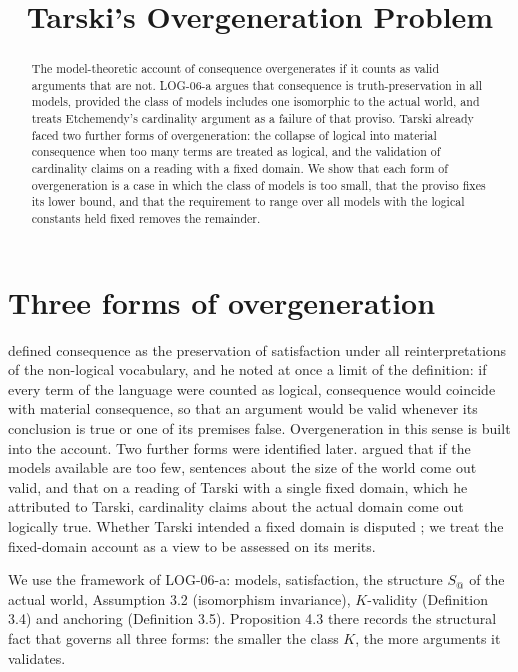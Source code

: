 \documentclass{situationist-preprint}
\title{Tarski's Overgeneration Problem}
\begin{document}
\maketitle

\begin{abstract}
The model-theoretic account of consequence overgenerates if it counts as valid arguments that are not. LOG-06-a argues that consequence is truth-preservation in all models, provided the class of models includes one isomorphic to the actual world, and treats Etchemendy's cardinality argument as a failure of that proviso. Tarski already faced two further forms of overgeneration: the collapse of logical into material consequence when too many terms are treated as logical, and the validation of cardinality claims on a reading with a fixed domain. We show that each form of overgeneration is a case in which the class of models is too small, that the proviso fixes its lower bound, and that the requirement to range over all models with the logical constants held fixed removes the remainder.
\end{abstract}

\section{Three forms of overgeneration}

\citet{Tarski1936} defined consequence as the preservation of satisfaction under all reinterpretations of the non-logical vocabulary, and he noted at once a limit of the definition: if every term of the language were counted as logical, consequence would coincide with material consequence, so that an argument would be valid whenever its conclusion is true or one of its premises false. Overgeneration in this sense is built into the account. Two further forms were identified later. \citet{Etchemendy1990} argued that if the models available are too few, sentences about the size of the world come out valid, and that on a reading of Tarski with a single fixed domain, which he attributed to Tarski, cardinality claims about the actual domain come out logically true. Whether Tarski intended a fixed domain is disputed \citep{GomezTorrente1996,Bays2001,Mancosu2006}; we treat the fixed-domain account as a view to be assessed on its merits.

We use the framework of LOG-06-a: models, satisfaction, the structure $S_@$ of the actual world, Assumption 3.2 (isomorphism invariance), $K$-validity (Definition 3.4) and anchoring (Definition 3.5). Proposition 4.3 there records the structural fact that governs all three forms: the smaller the class $K$, the more arguments it validates.
\end{document}
